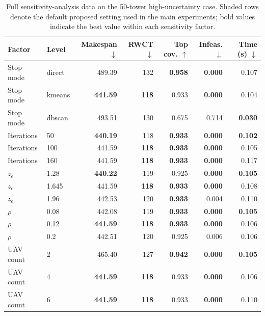 \begin{table}[H]
\centering
\caption{Full sensitivity-analysis data on the 50-tower high-uncertainty case. Shaded rows denote the default proposed setting used in the main experiments; bold values indicate the best value within each sensitivity factor.}
\label{tab:sensitivity-results}
\small
\setlength{\tabcolsep}{2.7pt}
\begin{tabular}{@{}llrrrrr@{}}
\toprule
Factor & Level & Makespan $\downarrow$ & RWCT $\downarrow$ & Top cov. $\uparrow$ & Infeas. $\downarrow$ & Time (s) $\downarrow$ \\
\midrule

Stop mode & direct & 489.39 & 132 & \textbf{0.958} & \textbf{0.000} & 0.107 \\
\rowcolor{gray!10}
Stop mode & kmeans & \textbf{441.59} & \textbf{118} & 0.933 & \textbf{0.000} & 0.104 \\

Stop mode & dbscan & 493.51 & 130 & 0.675 & 0.714 & \textbf{0.030} \\
\addlinespace[2pt]

Iterations & 50 & \textbf{440.19} & 118 & \textbf{0.933} & \textbf{0.000} & \textbf{0.102} \\
\rowcolor{gray!10}
Iterations & 100 & 441.59 & \textbf{118} & \textbf{0.933} & \textbf{0.000} & 0.105 \\

Iterations & 160 & 441.59 & \textbf{118} & \textbf{0.933} & \textbf{0.000} & 0.117 \\
\addlinespace[2pt]

$z_\epsilon$ & 1.28 & \textbf{440.22} & 119 & 0.925 & \textbf{0.000} & \textbf{0.105} \\
\rowcolor{gray!10}
$z_\epsilon$ & 1.645 & 441.59 & \textbf{118} & \textbf{0.933} & \textbf{0.000} & 0.108 \\

$z_\epsilon$ & 1.96 & 442.53 & 120 & \textbf{0.933} & 0.004 & 0.110 \\
\addlinespace[2pt]

$\rho$ & 0.08 & 442.08 & 119 & \textbf{0.933} & \textbf{0.000} & \textbf{0.105} \\
\rowcolor{gray!10}
$\rho$ & 0.12 & \textbf{441.59} & \textbf{118} & \textbf{0.933} & \textbf{0.000} & 0.106 \\

$\rho$ & 0.2 & 442.51 & 120 & 0.925 & 0.006 & 0.106 \\
\addlinespace[2pt]

UAV count & 2 & 465.40 & 127 & \textbf{0.942} & \textbf{0.000} & \textbf{0.105} \\
\rowcolor{gray!10}
UAV count & 4 & \textbf{441.59} & \textbf{118} & 0.933 & \textbf{0.000} & 0.106 \\

UAV count & 6 & \textbf{441.59} & \textbf{118} & 0.933 & \textbf{0.000} & 0.110 \\
\bottomrule
\end{tabular}
\end{table}
